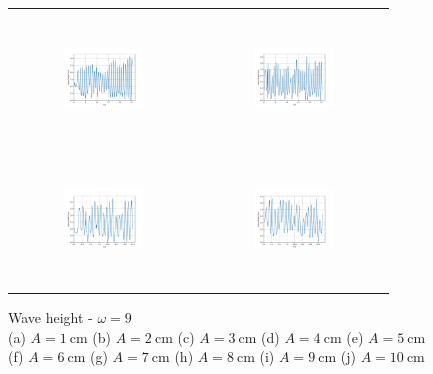 \begin{figure}[H]
\begin{center}
\begin{tabular}{cc}
\includegraphics[width=0.45\textwidth, height=3.5cm]{graph/omega=2.50_A=7_wave.pdf}
&
\includegraphics[width=0.45\textwidth, height=3.5cm]{graph/omega=2.50_A=8_wave.pdf}\\
\includegraphics[width=0.45\textwidth, height=3.5cm]{graph/omega=2.50_A=9_wave.pdf}
&
\includegraphics[width=0.45\textwidth, height=3.5cm]{graph/omega=2.50_A=10_wave.pdf}\\
\end{tabular}
\end{center}
\caption{Wave height - $\omega=9$ \\ (a) $A=1\mathrm{~cm}$ (b) $A=2\mathrm{~cm}$ (c) $A=3\mathrm{~cm}$ (d) $A=4\mathrm{~cm}$ (e) $A=5\mathrm{~cm}$\\(f) $A=6\mathrm{~cm}$ (g) $A=7\mathrm{~cm}$ (h) $A=8\mathrm{~cm}$ (i) $A=9\mathrm{~cm}$ (j) $A=10\mathrm{~cm}$}
\label{Data_omega=9_wave}
\end{figure}

